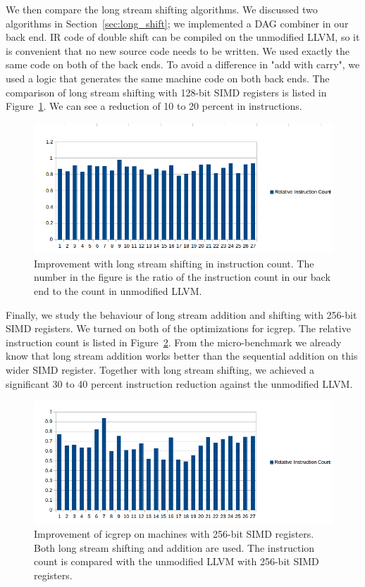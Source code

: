 We then compare the long stream shifting algorithms. We discussed two algorithms in Section~\ref{sec:long_shift}; we implemented a DAG combiner in our back end. IR code of double shift can be compiled on the unmodified LLVM, so it is convenient that no new source code needs to be written. We used exactly the same code on both of the back ends. To avoid a difference in "add with carry", we used a logic that generates the same machine code on both back ends. The comparison of long stream shifting with 128-bit SIMD registers is listed in Figure~\ref{fig:inst_count_long_shift}. We can see a reduction of 10 to 20 percent in instructions.

\begin{figure}[htbp!]
\centering
\includegraphics[width=140mm]{draw/inst_count_long_shift.png}
\caption[Improvement with long stream shifting in instruction count]{Improvement with long stream shifting in instruction count. The number in the figure is the ratio of the instruction count in our back end to the count in unmodified LLVM.}
\label{fig:inst_count_long_shift}
\end{figure}

Finally, we study the behaviour of long stream addition and shifting with 256-bit SIMD registers. We turned on both of the optimizations for icgrep. The relative instruction count is listed in Figure~\ref{fig:inst_count_all_256}. From the micro-benchmark we already know that long stream addition works better than the sequential addition on this wider SIMD register. Together with long stream shifting, we achieved a significant 30 to 40 percent instruction reduction against the unmodified LLVM.

\begin{figure}[htbp!]
\centering
\includegraphics[width=140mm]{draw/inst_count_all_256.png}
\caption[Improvement of icgrep on machines with 256-bit SIMD registers]{Improvement of icgrep on machines with 256-bit SIMD registers. Both long stream shifting and addition are used. The instruction count is compared with the unmodified LLVM with 256-bit SIMD registers.}
\label{fig:inst_count_all_256}
\end{figure}
